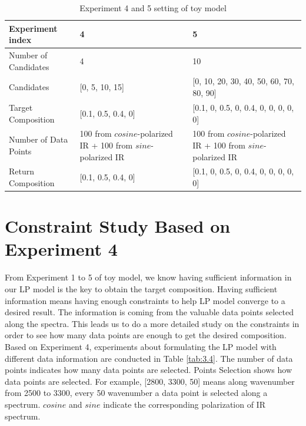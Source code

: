 \begin{table} \small 
\begin{center}
\begin{tabular}{| l | p{5cm} | l |}
\hline
Experiment index & 4 & 5\\
\hline
Number of Candidates & 4 & 10 \\
\hline
Candidates & [0, 5, 10, 15] & [0, 10, 20, 30, 40, 50, 60, 70, 80, 90] \\
\hline
Target Composition & [0.1, 0.5, 0.4, 0] & [0.1, 0, 0.5, 0, 0.4, 0, 0, 0, 0, 0]\\
\hline
Number of Data Points & 100 from $cosine$-polarized IR + 100 from $sine$-polarized IR & 100 from $cosine$-polarized IR + 100 from $sine$-polarized IR\\
\hline
Return Composition & [0.1, 0.5, 0.4, 0] & [0.1, 0, 0.5, 0, 0.4, 0, 0, 0, 0, 0] \\
\hline
\end{tabular} 
\caption{Experiment 4 and 5 setting of toy model}\label{tab:3.3}
\end{center}
\end{table}		

\section{Constraint Study Based on Experiment 4}

From Experiment 1 to 5 of toy model, we know having sufficient information in our LP model is the key to obtain the target composition. Having sufficient information means having enough constraints to help LP model converge to a desired result. The information is coming from the valuable data points selected along the spectra. This leads us to do a more detailed study on the constraints in order to see how many data points are enough to get the desired composition.\\ 

Based on Experiment 4, experiments about formulating the LP model with different data information are conducted in Table \ref{tab:3.4}. The number of data points indicates how many data points are selected. Points Selection shows how data points are selected. For example, [2800, 3300, 50] means along wavenumber from 2500 to 3300, every 50 wavenumber a data point is selected along a spectrum. $cosine$ and $sine$ indicate the corresponding polarization of IR spectrum. \\

